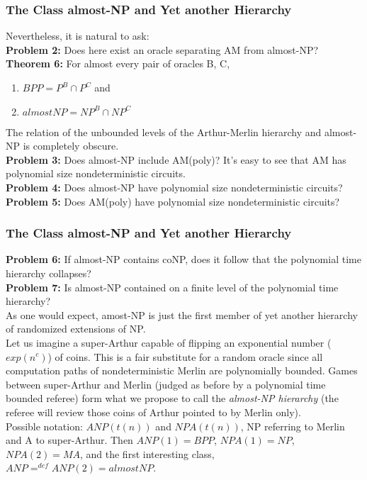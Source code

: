 \documentclass{beamer}
\begin{document}
\begin{frame}
\frametitle{The Class almost-NP and Yet another Hierarchy}
Nevertheless, it is natural to ask:\\
\textbf{Problem 2:} Does here exist an oracle separating AM from almost-NP?\\
\textbf{Theorem 6:} For almost every pair of oracles B, C,
\begin{enumerate}
\item $BPP = P^B \cap P^C$ and
\item $almostNP = NP^B \cap NP^C$
\end{enumerate}
The relation of the unbounded levels of the Arthur-Merlin hierarchy and almost-NP is completely obscure.\\
\textbf{Problem 3:} Does almost-NP include AM(poly)? It's easy to see that AM has polynomial size nondeterministic circuits.\\
\textbf{Problem 4:} Does almost-NP have polynomial size nondeterministic circuits?\\
\textbf{Problem 5:} Does AM(poly) have polynomial size nondeterministic circuits?\\
\end{frame}

\begin{frame}
\frametitle{The Class almost-NP and Yet another Hierarchy}
\textbf{Problem 6:} If almost-NP contains coNP, does it follow that the polynomial time hierarchy collapses?\\
\textbf{Problem 7:} Is almost-NP contained on a finite level of the polynomial time hierarchy?\\
As one would expect, amost-NP is just the first member of yet another hierarchy of randomized extensions of NP.\\
Let us imagine a super-Arthur capable of flipping an exponential number ($exp(n^c)$) of coins. This is a fair substitute for a random oracle since all computation paths of nondeterministic Merlin are polynomially bounded. Games between super-Arthur and Merlin (judged as before by a polynomial time bounded referee) form what we propose to call the \textit{almost-NP hierarchy} (the referee will review those coins of Arthur pointed to by Merlin only).\\
Possible notation: $ANP(t(n))$ and $NPA(t(n))$, NP referring to Merlin and A to super-Arthur. Then $ANP(1) = BPP$, $NPA(1) = NP$, $NPA(2) = MA$, and the first interesting class, $ANP =^{def} ANP(2) = almostNP$. 
\end{frame} 
\end{document}
